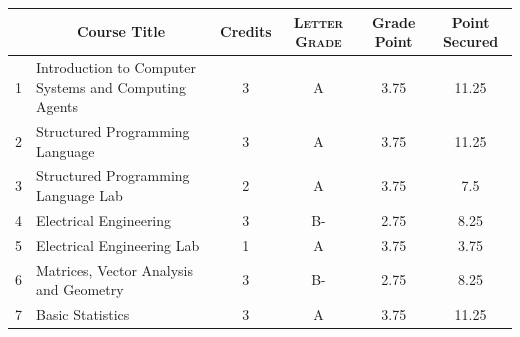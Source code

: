 \documentclass[11pt]{article}
\newcommand*{\numtwo}[1]{\pgfmathprintnumber[
                    fixed, precision=2, fixed zerofill=true]{#1}}
\begin{document}
                \begin{center}
                    \renewcommand{\arraystretch}{1.08}
                    
                \begin{tabular}{|c|l|c|>{\scshape}c|c|c|}
                \hline  \rule[-1ex]{0pt}{3.5ex} {\centering{\bf Course Code}} &  \multicolumn{1}{c|}{\textbf{Course Title}}  & {\bf Credits} & {\bf Letter Grade} & {\bf Grade Point} & {\bf Point Secured}  \\ 
                \hline   1 &  Introduction to Computer Systems and Computing Agents		 & 3 & A & 3.75 & 11.25 \\ %
                \hline   2 &  Structured Programming Language		 & 3 & A & 3.75 & 11.25 \\ %
                \hline   3 &  Structured Programming Language Lab		 & 2 & A & 3.75 & 7.5 \\ %
                \hline   4 &  Electrical Engineering		 & 3 & B- & 2.75 & 8.25 \\ %
                \hline   5 &  Electrical Engineering Lab		 & 1 & A & 3.75 & 3.75 \\ %
                \hline   6 &  Matrices, Vector Analysis and Geometry		 & 3 & B- & 2.75 & 8.25 \\ %
                \hline   7 &  Basic Statistics		 & 3 & A & 3.75 & 11.25 \\ %

\hline                %
                \end{tabular}
                \end{center}
                \renewcommand{\arraystretch}{1.03}
\end{document}
